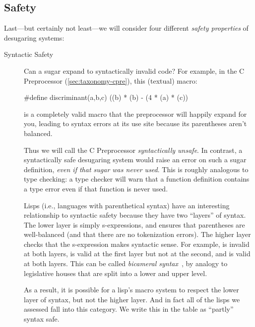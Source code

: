 \subsection{Safety}\label{sec:taxonomy-safety}

Last---but certainly not least---we will consider four different
\emph{safety properties} of desugaring systems:
\begin{description}
  \item[Syntactic Safety] Can a sugar expand to syntactically invalid
    code? For example, in the C Preprocessor (\cref{sec:taxonomy-cpre}), this
    (textual) macro:
\begin{CorrectlyIndentedCodes}
#define discriminant(a,b,c) ((b) * (b) - (4 * (a) * (c))
\end{CorrectlyIndentedCodes}
    is a completely valid macro that the preprocessor will happily
    expand for you, leading to syntax errors at its use site because
    its parentheses aren't balanced.

    Thus we will call the C Preprocessor \emph{syntactically unsafe}.
    In contrast, a syntactically safe desugaring system would raise an
    error on such a sugar definition, \emph{even if that sugar was
      never used}. This is roughly analogous to type checking: a type checker
    will warn that a function definition contains a type error even
    if that function is never used.

    Lisps (i.e., languages with parenthetical syntax) have an
    interesting relationship to syntactic safety because they have two
    ``layers'' of syntax.
    The lower layer is simply s-expressions, and ensures that parentheses
    are well-balanced (and that there are no tokenization errors).
    The higher layer checks that the s-expression makes syntactic sense.
    For example,  is invalid at both layers,
     is valid at the first layer but not at the
    second, and  is valid at both layers.
    This can be called \emph{bicameral syntax}~\cite[page 13]{plai}, by analogy to legislative
    houses that are split into a lower and upper level.

    As a result, it is possible for a lisp's macro system to respect
    the lower layer of syntax, but not the higher layer. And in fact
    all of the lisps we assessed fall into this category. We write
    this in the table as ``partly'' syntax safe.


\end{description}
